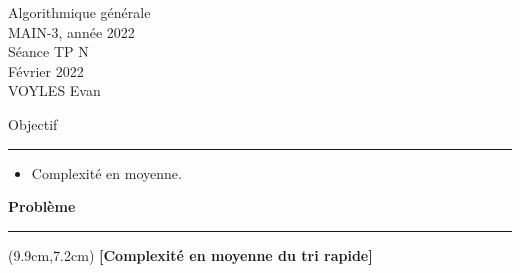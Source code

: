 \documentclass[10pt]{article} %
\newcommand{\aspurp}[1]{\textcolor{mypurp}{{\bf#1}}}
\begin{document}


\vspace{-1cm}
\vspace{0.3cm}

{\raggedleft \color{mygold} Algorithmique générale\\
MAIN-3, année 2022\\
Séance TP N\\
Février 2022\\
VOYLES Evan\\}

\vspace{-0.42cm}
\vspace{1.23cm}

{\Large \noindent \color{mygold} Objectif}

{\color{mygold}\noindent\rule{\textwidth}{1pt}}
\vspace{0cm}
\begin{itemize}
    \item[{\color{mygold}\ding{43}}] Complexité en moyenne.
\end{itemize}

\vspace{1.2cm}
{\color{dullgreen}\noindent \Large \bf Problème}

\vspace{-0.28cm}
{\vspace{0cm}\color{dullgreen}\noindent\rule{\textwidth}{1pt}}

\begin{textblock*}{10cm}(9.9cm,7.2cm) %
    \Large \aspurp{[Complexité en moyenne du tri rapide]}
\end{textblock*}
\end{document}
